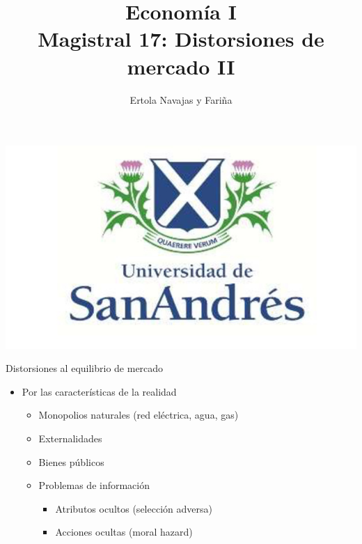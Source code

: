\documentclass{beamer}
\title[Economía I]{Economía I \vspace{4mm}
\\ Magistral 17: Distorsiones de mercado II}
\date{}
\author[Ertola Navajas y Fariña]{Ertola Navajas y Fariña}
\institute[]{Universidad de San Andrés}
\begin{document}
\begin{frame}
\titlepage
\centering
\includegraphics[scale=0.2]{Slides Principios de Economia/Figures/logoUDESA.jpg} 
\end{frame}


\begin{frame}{Distorsiones al equilibrio de mercado}
    \begin{itemize}
        \item Por las características de la realidad \vspace{1mm}
        \begin{itemize}
            \item Monopolios naturales (red eléctrica, agua, gas)   
             \vspace{1mm}
            \item Externalidades
             \vspace{1mm}
            \item Bienes públicos
            \vspace{1mm}
            \item Problemas de información
            \begin{itemize}
                \item Atributos ocultos (selección adversa)
                 \vspace{1mm}
                \item Acciones ocultas (moral hazard)
            \end{itemize}        
        \end{itemize}
    \end{itemize}
\end{frame}
\end{document}
